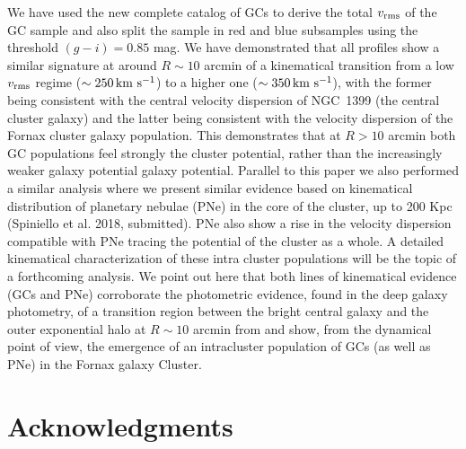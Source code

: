 \documentclass[usenatbib]{mnras}
\newcommand{\kms}{\mbox{\,km~s$^{-1}$}}
\begin{document}
We have used the new complete catalog of GCs to derive the total  $v_{\rm rms}$ 
of the GC sample and also split the sample in red and blue subsamples using
the threshold $(g - i) = 0.85$ mag.
We have demonstrated that all profiles show a similar signature at around 
$R\sim10$ arcmin of a kinematical transition from a low $v_{\rm rms}$ regime ($\sim 250 \kms$) to a 
higher one ($\sim 350 \kms$), with the former being consistent with the central velocity 
dispersion of NGC~1399 (the central cluster galaxy) and the latter being 
consistent with the velocity dispersion of the Fornax cluster galaxy population. This 
demonstrates that at $R>10$ arcmin both GC populations feel strongly the cluster 
potential, rather than the increasingly weaker galaxy potential galaxy potential. Parallel to this paper 
we also performed a similar analysis where we present similar evidence based on 
kinematical distribution of planetary nebulae (PNe) in the core of the cluster, 
up to 200 Kpc (Spiniello et al. 2018, submitted). PNe also show a rise in the 
velocity dispersion compatible with PNe tracing the potential of the cluster as 
a whole. A detailed kinematical characterization of these intra cluster populations will 
be the topic of a forthcoming analysis. We point out here that both lines of kinematical 
evidence (GCs and PNe) corroborate the photometric evidence, found in the deep 
galaxy photometry, of a transition region between the bright central galaxy and 
the outer exponential halo at $R\sim10$ arcmin from \citet{Iodice16} and 
show, from the dynamical point of view, the emergence of an intracluster 
population of GCs (as well as PNe) in the Fornax galaxy Cluster.

\section*{Acknowledgments}
\end{document}
